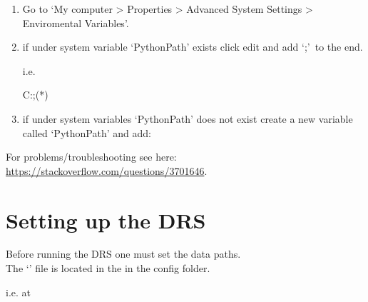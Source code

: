 \begin{enumerate}
\item Go to `My computer > Properties > Advanced System Settings > Enviromental Variables'.

\item if under system variable `PythonPath' exists click edit and add `\InstallDIR;'\, to the end.

\noindent i.e.

\begin{textbox}[title={In "Enviromental Variables"}]
C:;(*\InstallDIR*)\bin\;
\end{textbox}

\item if under system variables `PythonPath' does not exist create a new variable called `PythonPath' and add:

\begin{textbox}[title={In "Enviromental Variables"}]
\end{textbox}

\end{enumerate}

\noindent For problems/troubleshooting see here: \url{https://stackoverflow.com/questions/3701646}.



\clearpage
\newpage
\section{Setting up the DRS}
\label{ch:install:setup}

Before running the DRS one must set the data paths. \\

\noindent The `\configtxtfile' file is located in the \InstallDIR in the config folder.

i.e. at  \\

